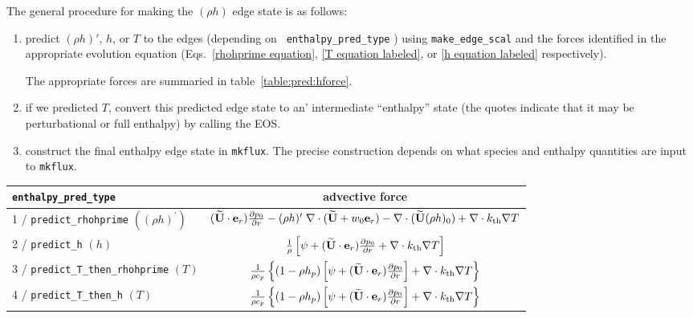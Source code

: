 The general procedure for making the $(\rho h)$ edge state is as follows:
\begin{enumerate}
\item predict $(\rho h)'$, $h$, or $T$ to the edges (depending on {\tt
  enthalpy\_pred\_type} ) using {\tt make\_edge\_scal} and the forces
  identified in the appropriate evolution equation
  (Eqs.~\ref{rhohprime equation}, \ref{T equation labeled}, or \ref{h
    equation labeled} respectively).

  The appropriate forces are summaried in table~\ref{table:pred:hforce}.

\item if we predicted $T$, convert this predicted
  edge state to an' intermediate ``enthalpy'' state (the quotes
  indicate that it may be perturbational or full enthalpy) by calling
  the EOS.
 
\item construct the final enthalpy edge state in {\tt mkflux}.  The
  precise construction depends on what species and enthalpy quantities
  are input to {\tt mkflux}.

\end{enumerate}

\begin{table*}[h]
\centering
\caption{Forcing term into {\tt make\_edge\_scal} \newline}
\label{table:pred:hforce}
\renewcommand{\arraystretch}{1.5}
\begin{tabular}{l|c}
\hline
\hline
{\tt enthalpy\_pred\_type} &   {advective force} \\
\hline
1 / {\tt predict\_rhohprime} $((\rho h)^\prime)$ &  $(\widetilde{{\bf U}} \cdot \mathbf{e}_r) \frac{\partial p_0}{\partial r} - 
 (\rho h)^\prime \; \nabla \cdot (\widetilde{{\bf U}}+w_0 \mathbf{e}_r) - 
 \nabla \cdot (\widetilde{{\bf U}} (\rho h)_0) + \nabla \cdot k_{\rm th} \nabla T$ \\
2 / {\tt predict\_h}  $(h)$ & $\frac{1}{\rho} \left [\psi + (\widetilde{{\bf U}} \cdot \mathbf{e}_r)
  \frac{\partial p_0}{\partial r} + \nabla \cdot k_{\rm th} \nabla T \right ]$ \\
3 / {\tt predict\_T\_then\_rhohprime} $(T)$ & $\frac{1}{\rho c_p} \left \{ (1 - \rho h_p) 
   \left [\psi + (\widetilde{{\bf U}} \cdot \mathbf{e}_r) \frac{\partial p_0}{\partial r} \right ] + \nabla \cdot k_{\rm th} \nabla T \right \}$ \\
4 / {\tt predict\_T\_then\_h}  $(T)$ & $\frac{1}{\rho c_p} \left\{ (1 - \rho h_p) \left [\psi + (\widetilde{{\bf U}} \cdot \mathbf{e}_r)
\frac{\partial p_0}{\partial r}\right ] +  \nabla \cdot k_{\rm th} \nabla T \right\}$ \\
\hline
\end{tabular}
\end{table*}


